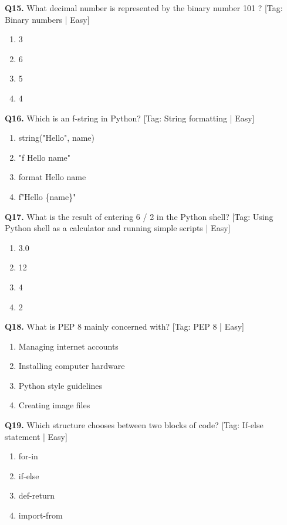 \vspace{2mm}
\noindent\textbf{Q15.} What decimal number is represented by the binary number 101 ? \hfill [Tag: Binary numbers | Easy]
\begin{enumerate}[label=(\alph*),topsep=2pt,itemsep=1pt,partopsep=0pt,parsep=0pt]
    \item {3}
    \item {6}
    \item {5}
    \item {4}
\end{enumerate}
\vspace{2mm}
\noindent\textbf{Q16.} Which is an f-string in Python? \hfill [Tag: String formatting | Easy]
\begin{enumerate}[label=(\alph*),topsep=2pt,itemsep=1pt,partopsep=0pt,parsep=0pt]
    \item {string("Hello", name)}
    \item {"f Hello name"}
    \item {format Hello name}
    \item {f"Hello \{name\}"}
\end{enumerate}
\vspace{2mm}
\noindent\textbf{Q17.} What is the result of entering 6 / 2 in the Python shell? \hfill [Tag: Using Python shell as a calculator and running simple scripts | Easy]
\begin{enumerate}[label=(\alph*),topsep=2pt,itemsep=1pt,partopsep=0pt,parsep=0pt]
    \item {3.0}
    \item {12}
    \item {4}
    \item {2}
\end{enumerate}
\vspace{2mm}
\noindent\textbf{Q18.} What is PEP 8 mainly concerned with? \hfill [Tag: PEP 8 | Easy]
\begin{enumerate}[label=(\alph*),topsep=2pt,itemsep=1pt,partopsep=0pt,parsep=0pt]
    \item {Managing internet accounts}
    \item {Installing computer hardware}
    \item {Python style guidelines}
    \item {Creating image files}
\end{enumerate}
\vspace{2mm}
\noindent\textbf{Q19.} Which structure chooses between two blocks of code? \hfill [Tag: If-else statement | Easy]
\begin{enumerate}[label=(\alph*),topsep=2pt,itemsep=1pt,partopsep=0pt,parsep=0pt]
    \item {for-in}
    \item {if-else}
    \item {def-return}
    \item {import-from}
\end{enumerate}

